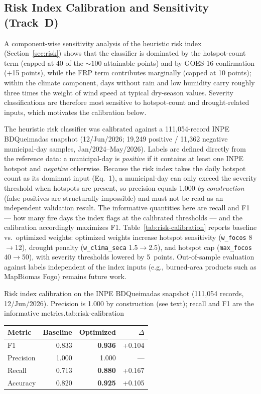 \subsection{Risk Index Calibration and Sensitivity (Track~D)}
\label{sec:risk-calibration-exp}

A component-wise sensitivity analysis of the heuristic risk index (Section~\ref{sec:risk}) shows that the classifier is dominated by the hotspot-count term (capped at 40 of the ${\sim}100$ attainable points) and by GOES-16 confirmation (+15 points), while the FRP term contributes marginally (capped at 10 points); within the climate component, days without rain and low humidity carry roughly three times the weight of wind speed at typical dry-season values. Severity classifications are therefore most sensitive to hotspot-count and drought-related inputs, which motivates the calibration below.

The heuristic risk classifier was calibrated against a 111{,}054-record INPE BDQueimadas snapshot (12/Jun/2026; 19{,}249 positive / 11{,}362 negative municipal-day samples, Jan/2024--May/2026). Labels are defined directly from the reference data: a municipal-day is \emph{positive} if it contains at least one INPE hotspot and \emph{negative} otherwise. Because the risk index takes the daily hotspot count as its dominant input (Eq.~1), a municipal-day can only exceed the severity threshold when hotspots are present, so precision equals 1.000 \emph{by construction} (false positives are structurally impossible) and must not be read as an independent validation result. The informative quantities here are recall and F1 --- how many fire days the index flags at the calibrated thresholds --- and the calibration accordingly maximizes F1. Table~\ref{tab:risk-calibration} reports baseline vs.\ optimized weights: optimized weights increase hotspot sensitivity (\texttt{w\_focos} 8$\rightarrow$12), drought penalty (\texttt{w\_clima\_seca} 1.5$\rightarrow$2.5), and hotspot cap (\texttt{max\_focos} 40$\rightarrow$50), with severity thresholds lowered by 5~points. Out-of-sample evaluation against labels independent of the index inputs (e.g., burned-area products such as MapBiomas Fogo) remains future work.

\begin{resulttable}{Risk index calibration on the INPE BDQueimadas snapshot (111{,}054 records, 12/Jun/2026). Precision is 1.000 by construction (see text); recall and F1 are the informative metrics.}{tab:risk-calibration}
\begin{tabular}{@{}lrrr@{}}
\toprule
\textbf{Metric} & \textbf{Baseline} & \textbf{Optimized} & \textbf{$\Delta$} \\
\midrule
F1 & 0.833 & \textbf{0.936} & +0.104 \\
Precision & 1.000 & 1.000 & --- \\
Recall & 0.713 & \textbf{0.880} & +0.167 \\
Accuracy & 0.820 & \textbf{0.925} & +0.105 \\
\bottomrule
\end{tabular}
\end{resulttable}

